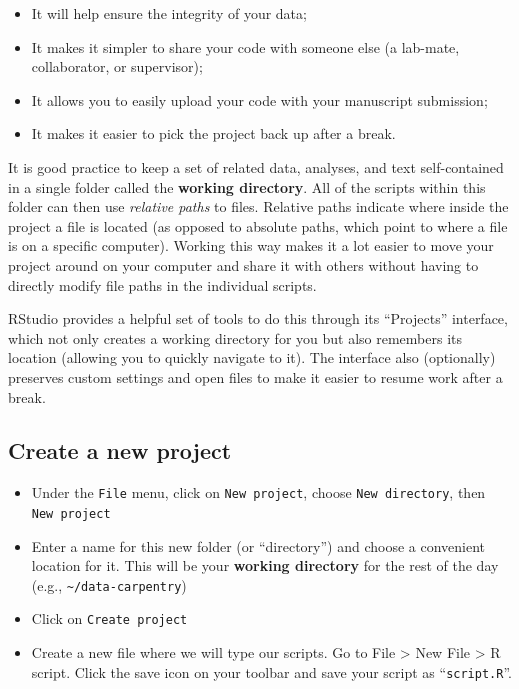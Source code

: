 \documentclass[]{book}
\providecommand{\tightlist}{%
  \setlength{\itemsep}{0pt}\setlength{\parskip}{0pt}}
\begin{document}
\begin{itemize}
\tightlist
\item
  It will help ensure the integrity of your data;
\item
  It makes it simpler to share your code with someone else (a lab-mate,
  collaborator, or supervisor);
\item
  It allows you to easily upload your code with your manuscript
  submission;
\item
  It makes it easier to pick the project back up after a break.
\end{itemize}

It is good practice to keep a set of related data, analyses, and text
self-contained in a single folder called the \textbf{working directory}.
All of the scripts within this folder can then use \emph{relative paths}
to files. Relative paths indicate where inside the project a file is
located (as opposed to absolute paths, which point to where a file is on
a specific computer). Working this way makes it a lot easier to move
your project around on your computer and share it with others without
having to directly modify file paths in the individual scripts.

RStudio provides a helpful set of tools to do this through its
``Projects'' interface, which not only creates a working directory for
you but also remembers its location (allowing you to quickly navigate to
it). The interface also (optionally) preserves custom settings and open
files to make it easier to resume work after a break.

\subsection{Create a new project}\label{create-a-new-project}

\begin{itemize}
\tightlist
\item
  Under the \texttt{File} menu, click on \texttt{New\ project}, choose
  \texttt{New\ directory}, then \texttt{New\ project}
\item
  Enter a name for this new folder (or ``directory'') and choose a
  convenient location for it. This will be your \textbf{working
  directory} for the rest of the day (e.g.,
  \texttt{\textasciitilde{}/data-carpentry})
\item
  Click on \texttt{Create\ project}
\item
  Create a new file where we will type our scripts. Go to File
  \textgreater{} New File \textgreater{} R script. Click the save icon
  on your toolbar and save your script as ``\texttt{script.R}''.
\end{itemize}
\end{document}
